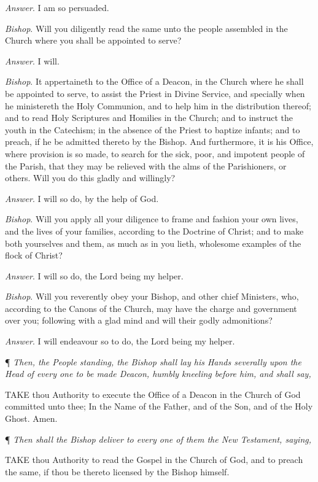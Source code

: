 \emph{Answer}. I am so persuaded.

\emph{Bishop}. Will you diligently read the same
unto the people assembled in the Church where you shall be appointed to
serve?

\emph{Answer}. I will.

\emph{Bishop}. It appertaineth to the Office
of a Deacon, in the Church where he shall be appointed to serve, to assist
the Priest in Divine Service, and specially when he ministereth the Holy
Communion, and to help him in the distribution thereof; and to read Holy
Scriptures and Homilies in the Church; and to instruct the youth in the
Catechism; in the absence of the Priest to baptize infants; and to preach,
if he be admitted thereto by the Bishop. And furthermore, it is his Office,
where provision is so made, to search for the sick, poor, and impotent
people of the Parish, that they may be relieved with the alms of the Parishioners,
or others. Will you do this gladly and willingly?

\emph{Answer}. I will so do, by the help of God.

\emph{Bishop}. Will you apply all your diligence
to frame and fashion your own lives, and the lives of your families, according
to the Doctrine of Christ; and to make both yourselves and them, as much
as in you lieth, wholesome examples of the flock of Christ?

\emph{Answer}. I will so do, the Lord being my helper.

\emph{Bishop}. Will you reverently obey your Bishop,
and other chief Ministers, who, according to the Canons of the Church,
may have the charge and government over you; following with a glad mind
and will their godly admonitions?

\emph{Answer}. I will endeavour so to do, the Lord
being my helper.

¶
\emph{Then, the People standing, the Bishop shall lay his Hands severally
upon the Head of every one to be made Deacon, humbly kneeling before
him, and shall say,}

TAKE
thou Authority to execute the Office of a Deacon in the Church of God
committed unto thee; In the Name of the Father, and of the Son, and
of the Holy Ghost. Amen.

¶ \emph{Then shall the
Bishop deliver to every one of them the New Testament, saying,}

TAKE thou Authority to
read the Gospel in the Church of God, and to preach the same, if thou
be thereto licensed by the Bishop himself.

